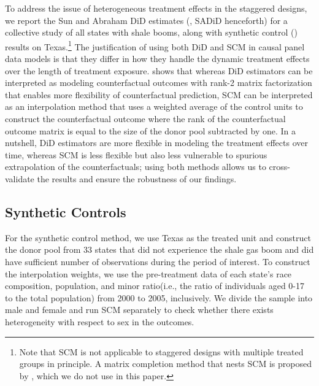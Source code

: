 To address the issue of heterogeneous treatment effects in the staggered designs, we report the Sun and Abraham DiD estimates (\cite{sun_estimating_2021}, SADiD henceforth) for a collective study of all states with shale booms, 
along with synthetic control (\cite{abadie2010synthetic}) results on Texas.\footnote{Note that SCM is not applicable to staggered designs with multiple treated groups in principle. A matrix completion method that nests SCM is proposed by \textcite{athey2021matrix}, which we do not use in this paper.}
The justification of using both DiD and SCM in causal panel data models is that they differ in how they handle the dynamic treatment effects over the length of treatment exposure.
\textcite{athey2021matrix} shows that whereas DiD estimators can be interpreted as modeling counterfactual outcomes with rank-2 matrix factorization 
that enables more flexibility of counterfactual prediction, SCM can be interpreted as an interpolation method that uses a weighted average of the control units to construct the counterfactual outcome where
the rank of the counterfactual outcome matrix is equal to the size of the donor pool subtracted by one.
In a nutshell, DiD estimators are more flexible in modeling the treatment effects over time, whereas SCM is less flexible but also less vulnerable to spurious extrapolation of the counterfactuals; 
using both methods allows us to cross-validate the results and ensure the robustness of our findings.

\subsection{Synthetic Controls}
For the synthetic control method, 
we use Texas as the treated unit and construct the donor pool 
from 33 states that did not experience the shale gas boom and
did have sufficient number of observations during the period of interest. 
To construct the interpolation weights, we use the pre-treatment data of
each state's race composition, population, and minor ratio(i.e., the ratio of individuals aged 0-17 to the total population)
from 2000 to 2005, inclusively.
We divide the sample into male and female and run SCM separately to check whether there exists heterogeneity with respect to sex in the outcomes.



